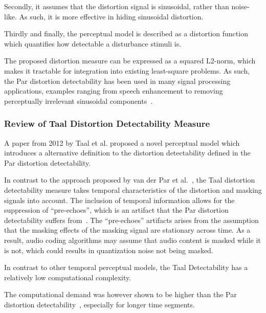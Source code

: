 Secondly, it assumes that the distortion signal is sinusoidal, rather than noise-like.
As such, it is more effective in hiding sinusoidal distortion.

Thirdly and finally, the perceptual model is described as a distortion function which quantifies how 
detectable a disturbance stimuli is.

The proposed distortion measure can be expressed as a squared L2-norm, which makes it tractable for integration 
into existing least-square problems.
As such, the Par distortion detectability has been used in many signal processing applications, 
examples ranging from speech enhancement to removing perceptually irrelevant sinusoidal 
components~\cite{balazs2009time, taal2013optimal}.

\subsubsection{Review of Taal Distortion Detectability Measure}
A paper from 2012 by Taal et al. proposed a novel perceptual model \cite{taal2012low} which introduces a
alternative definition to the distortion detectability defined in the Par distortion detectability.

In contrast to the approach proposed by van der Par et al.~\cite{van2005perceptual},
the Taal distortion detectability measure takes temporal characteristics of the distortion and masking signals into account.
The inclusion of temporal information allows for the suppression of ``pre-echoes'', which is an artifact that 
the Par distortion detectability suffers from~\cite{taal2012low}. 
The ``pre-echoes'' artifacts arises from the assumption that the masking effects of the 
masking signal are stationary across time. 
As a result, audio coding algorithms may assume that audio content is masked while it is not, 
which could results in quantization noise not being masked.

In contrast to other temporal perceptual models, the Taal Detectability has a relatively low computational complexity.

The computational demand was however shown to be higher than the Par distortion detectability~\cite{taal2012low}, 
especially for longer time segments.

